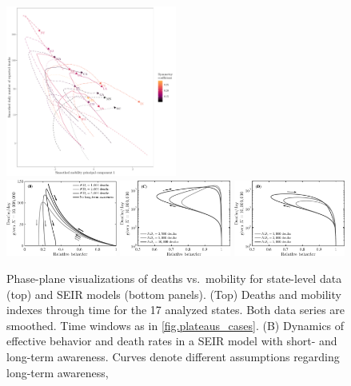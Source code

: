 \begin{figure}
\begin{center}
\mbox{\hspace{0.05\textwidth}}
\includegraphics[width=0.5\textwidth]{deaths/national_deaths_metric_phase_pca_grand.pdf}\\
\includegraphics[width=0.325\textwidth]{scripts/figseir_phase2_noname.pdf}
\includegraphics[width=0.325\textwidth]{scripts/figseir_phase2_statefix_noname.pdf}
\includegraphics[width=0.325\textwidth]{scripts/figseir_phase2_state_noname.pdf}
\caption{Phase-plane visualizations of deaths vs.~mobility for state-level
data (top) and SEIR models (bottom panels).
(Top) Deaths and mobility indexes through time for the 17 analyzed states. Both data series are smoothed. 
Time windows as in \ref{fig.plateaus_cases}.
(B)
Dynamics of effective behavior and death rates
in a SEIR model with short- and long-term awareness. 
Curves denote different assumptions regarding long-term awareness,
}
\end{center}
\end{figure}
